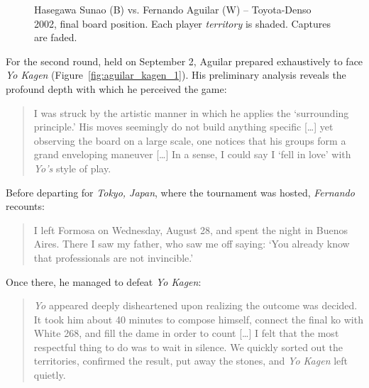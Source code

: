 \begin{figure}[H]
	\centering
	\begin{goban}[19x19,label={at = {south, west}},scale=1.3]
		
		
		
	\end{goban}

	\caption{
		Hasegawa Sunao (B) vs. Fernando Aguilar (W) -- Toyota-Denso 2002, final board position. Each player \textit{territory} is shaded. Captures are faded.}
	\label{fig:aguilar_hasegawa_1}
\end{figure}
For the second round, held on September 2, Aguilar prepared exhaustively to face \textit{Yo Kagen} (Figure~\ref{fig:aguilar_kagen_1}). His preliminary analysis reveals the profound depth with which he perceived the game:
\begin{quote}
	I was struck by the artistic manner in which he applies the `surrounding principle.' His moves seemingly do not build anything specific [\dots] yet observing the board on a large scale, one notices that his groups form a grand enveloping maneuver [\dots] In a sense, I could say I `fell in love' with \textit{Yo's} style of play.
\end{quote}
Before departing for \textit{Tokyo, Japan}, where the tournament was hosted, \textit{Fernando} recounts:
\begin{quote}
	I left Formosa on Wednesday, August 28, and spent the night in Buenos Aires. There I saw my father, who saw me off saying: `You already know that professionals are not invincible.’\,
\end{quote} 
Once there, he managed to defeat \textit{Yo Kagen}:
\begin{quote}
	\textit{Yo} appeared deeply disheartened upon realizing the outcome was decided. It took him about 40 minutes to compose himself, connect the final ko with White 268, and fill the dame in order to count [\dots] I felt that the most respectful thing to do was to wait in silence. We quickly sorted out the territories, confirmed the result, put away the stones, and \textit{Yo Kagen} left quietly.
\end{quote}

